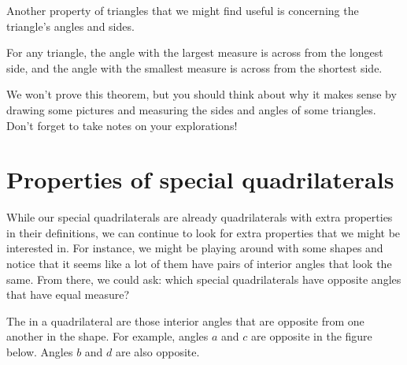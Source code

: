 \documentclass{ximera}
\begin{document}
Another property of triangles that we might find useful is concerning the triangle's angles and sides.
\begin{theorem}
For any triangle, the angle with the largest measure is across from the longest side, and the angle with the smallest measure is across from the shortest side.
\end{theorem}
We won't prove this theorem, but you should think about why it makes sense by drawing some pictures and measuring the sides and angles of some triangles. Don't forget to take notes on your explorations!


\section{Properties of special quadrilaterals}

While our special quadrilaterals are already quadrilaterals with extra properties in their definitions, 
we can continue to look for extra properties that we might be interested in. For instance, we might be 
playing around with some shapes and notice that it seems like a lot of them have pairs of interior angles 
that look the same. From there, we could ask: which special quadrilaterals have opposite angles that have equal measure?
\begin{definition}
The  in a quadrilateral are those interior angles that are opposite from one another in the shape. 
For example, angles $a$ and $c$ are opposite in the figure below. Angles $b$ and $d$ are also opposite.
\begin{image}
\end{image}
\end{definition}
\end{document}
